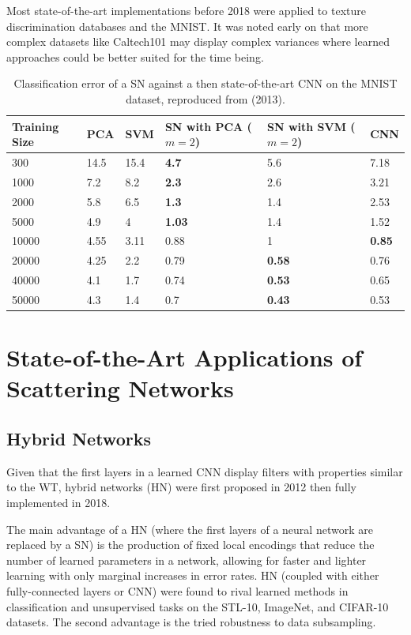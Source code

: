 \documentclass[runningheads]{llncs}
\begin{document}
Most state-of-the-art implementations before 2018 were applied to texture discrimination databases\cite{textureKTH}\cite{textureUIC}\cite{textureUMD} and the MNIST. It was noted early on that more complex datasets like Caltech101\cite{caltech} may display complex variances where learned approaches could be better suited for the time being\cite{bruna2012invariant}.
\begin{table}\centering
\caption{Classification error of a SN against a then state-of-the-art CNN\cite{lecun} on the MNIST dataset, reproduced from \cite{bruna2012invariant} (2013).}\label{tab2}
\begin{tabular}{| p{2cm} | p{1cm} | p{1cm} | p{3.2cm} | p{3.2cm} | p{1cm} |}
\hline
Training Size & PCA & SVM & SN with PCA ($m=2$) & SN with SVM ($m=2$) & CNN \\
\hline
300 & 14.5 & 15.4 & \textbf{4.7} & 5.6 & 7.18 \\
1000 & 7.2 & 8.2 & \textbf{2.3} & 2.6 & 3.21 \\
2000 & 5.8 & 6.5 & \textbf{1.3} & 1.4 & 2.53 \\
5000 & 4.9 & 4 & \textbf{1.03} & 1.4 & 1.52 \\
10000 & 4.55 & 3.11 & 0.88 & 1 & \textbf{0.85} \\
20000 & 4.25 & 2.2 & 0.79 & \textbf{0.58} & 0.76 \\
40000 & 4.1 & 1.7 & 0.74 & \textbf{0.53} & 0.65 \\
50000 & 4.3 & 1.4 & 0.7 & \textbf{0.43} & 0.53 \\
\hline
\end{tabular}
\end{table}

\section{State-of-the-Art Applications of Scattering Networks}

\subsection{Hybrid Networks}

Given that the first layers in a learned CNN display filters with properties similar to the WT\cite{mallatlecture}, hybrid networks (HN) were first proposed in 2012\cite{bruna2012invariant} then fully implemented in 2018\cite{oyallon}. 

The main advantage of a HN (where the first layers of a neural network are replaced by a SN) is the production of fixed local encodings that reduce the number of learned parameters in a network, allowing for faster and lighter learning with only marginal increases in error rates. HN (coupled with either fully-connected layers or CNN) were found to rival learned methods\cite{oyallon} in classification and unsupervised tasks on the STL-10\cite{stl}, ImageNet\cite{imagenet}, and CIFAR-10\cite{cifar} datasets. The second advantage is the tried robustness to data subsampling\cite{oyallon}.
\end{document}
